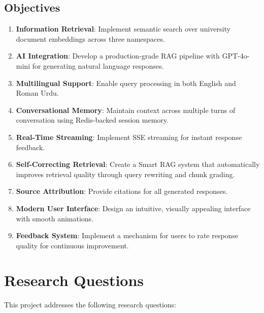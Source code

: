 \documentclass[12pt,a4paper]{book}
\numberwithin{table}{chapter}
\numberwithin{figure}{chapter}
\numberwithin{equation}{chapter}
\begin{document}
\subsection{Objectives}
\begin{enumerate}
    \item \textbf{Information Retrieval}: Implement semantic search over university document embeddings across three namespaces.

    \item \textbf{AI Integration}: Develop a production-grade RAG pipeline with GPT-4o-mini for generating natural language responses.

    \item \textbf{Multilingual Support}: Enable query processing in both English and Roman Urdu.

    \item \textbf{Conversational Memory}: Maintain context across multiple turns of conversation using Redis-backed session memory.

    \item \textbf{Real-Time Streaming}: Implement SSE streaming for instant response feedback.

    \item \textbf{Self-Correcting Retrieval}: Create a Smart RAG system that automatically improves retrieval quality through query rewriting and chunk grading.

    \item \textbf{Source Attribution}: Provide citations for all generated responses.

    \item \textbf{Modern User Interface}: Design an intuitive, visually appealing interface with smooth animations.

    \item \textbf{Feedback System}: Implement a mechanism for users to rate response quality for continuous improvement.
\end{enumerate}

\section{Research Questions}

This project addresses the following research questions:
\end{document}
